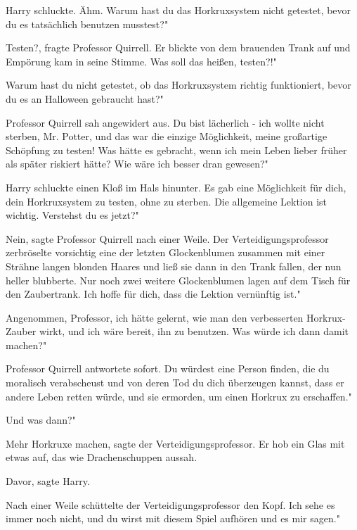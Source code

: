 Harry schluckte. \glqq{}Ähm. Warum hast du das Horkruxsystem nicht getestet,
bevor du es tatsächlich benutzen musstest?"

\glqq{}Testen?\grqq{}, fragte Professor Quirrell. Er blickte von dem brauenden
Trank auf und Empörung kam in seine Stimme. \glqq{}Was soll das heißen, testen?!"

\glqq{}Warum hast du nicht getestet, ob das Horkruxsystem richtig funktioniert,
bevor du es an Halloween gebraucht hast?"

Professor Quirrell sah angewidert aus. \glqq{}Du bist lächerlich - ich wollte
nicht sterben, Mr. Potter, und das war die einzige Möglichkeit, meine großartige
Schöpfung zu testen! Was hätte es gebracht, wenn ich mein Leben lieber früher
als später riskiert hätte? Wie wäre ich besser dran gewesen?"

Harry schluckte einen Kloß im Hals hinunter. \glqq{}Es gab eine Möglichkeit für
dich, dein Horkruxsystem zu testen, ohne zu sterben. Die allgemeine Lektion ist
wichtig. Verstehst du es jetzt?"

\glqq{}Nein\grqq{}, sagte Professor Quirrell nach einer Weile. Der
Verteidigungsprofessor zerbröselte vorsichtig eine der letzten Glockenblumen
zusammen mit einer Strähne langen blonden Haares und ließ sie dann in den Trank
fallen, der nun heller blubberte. Nur noch zwei weitere Glockenblumen lagen auf
dem Tisch für den Zaubertrank. \glqq{}Ich hoffe für dich, dass die Lektion
vernünftig ist."

\glqq{}Angenommen, Professor, ich hätte gelernt, wie man den verbesserten
Horkrux-Zauber wirkt, und ich wäre bereit, ihn zu benutzen. Was würde ich dann
damit machen?"

Professor Quirrell antwortete sofort. \glqq{}Du würdest eine Person finden, die
du moralisch verabscheust und von deren Tod du dich überzeugen kannst, dass er
andere Leben retten würde, und sie ermorden, um einen Horkrux zu erschaffen."

\glqq{}Und was dann?"

\glqq{}Mehr Horkruxe machen\grqq{}, sagte der Verteidigungsprofessor. Er hob ein
Glas mit etwas auf, das wie Drachenschuppen aussah.

\glqq{}Davor\grqq{}, sagte Harry.

Nach einer Weile schüttelte der Verteidigungsprofessor den Kopf. \glqq{}Ich sehe
es immer noch nicht, und du wirst mit diesem Spiel aufhören und es mir sagen."


